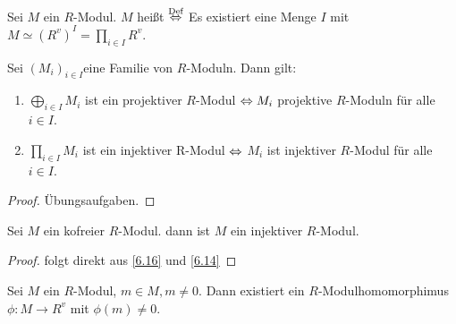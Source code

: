 \begin{df}\label{6.15}
	Sei $M$ ein $R$-Modul. $M$ heißt  $\overset{\text{Def}}{\Leftrightarrow}$ Es existiert eine Menge $ I$ mit $M \simeq (R^{v})^I = \prod_{i \in I} R^{v} $.
\end{df}
\begin{bem}\label{6.16}
	Sei $(M_i)_{i \in I} $eine Familie von $R$-Moduln. Dann gilt:
	\begin{enumerate} [label= \alph*)]
		\item $\bigoplus_{i \in I} M_i $ ist ein projektiver $R$-Modul $\Leftrightarrow M_i $ projektive $R$-Moduln für alle $ i \in I $.
		\item $\prod_{i \in I} M_i $ ist ein injektiver R-Modul $\Leftrightarrow$ $M_i $ ist injektiver $R$-Modul für alle $i  \in I $.
	\end{enumerate}
\end{bem}
\begin{proof}
	Übungsaufgaben.
\end{proof}
\begin{sa}\label{6.17}
	Sei $M$ ein kofreier $R$-Modul. dann ist $M$ ein injektiver $R$-Modul. 
\end{sa}
\begin{proof}
	folgt direkt aus \ref{6.16} und \ref{6.14}
\end{proof}
\begin{bem}\label{6.18}
	Sei $M$ ein $R$-Modul, $m \in M , m \neq 0 $. Dann existiert ein $R$-Modulhomomorphimus $\phi: M \to R^{v} $ mit $\phi(m) \neq 0.$
\end{bem}
